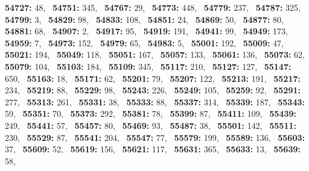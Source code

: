 \textbf{54727:} 48,\allowbreak~ 
\textbf{54751:} 345,\allowbreak~ 
\textbf{54767:} 29,\allowbreak~ 
\textbf{54773:} 448,\allowbreak~ 
\textbf{54779:} 237,\allowbreak~ 
\textbf{54787:} 325,\allowbreak~ 
\textbf{54799:} 3,\allowbreak~ 
\textbf{54829:} 98,\allowbreak~ 
\textbf{54833:} 108,\allowbreak~ 
\textbf{54851:} 24,\allowbreak~ 
\textbf{54869:} 50,\allowbreak~ 
\textbf{54877:} 80,\allowbreak~ 
\textbf{54881:} 68,\allowbreak~ 
\textbf{54907:} 2,\allowbreak~ 
\textbf{54917:} 95,\allowbreak~ 
\textbf{54919:} 191,\allowbreak~ 
\textbf{54941:} 99,\allowbreak~ 
\textbf{54949:} 173,\allowbreak~ 
\textbf{54959:} 7,\allowbreak~ 
\textbf{54973:} 152,\allowbreak~ 
\textbf{54979:} 65,\allowbreak~ 
\textbf{54983:} 5,\allowbreak~ 
\textbf{55001:} 192,\allowbreak~ 
\textbf{55009:} 47,\allowbreak~ 
\textbf{55021:} 194,\allowbreak~ 
\textbf{55049:} 118,\allowbreak~ 
\textbf{55051:} 167,\allowbreak~ 
\textbf{55057:} 133,\allowbreak~ 
\textbf{55061:} 136,\allowbreak~ 
\textbf{55073:} 62,\allowbreak~ 
\textbf{55079:} 104,\allowbreak~ 
\textbf{55103:} 184,\allowbreak~ 
\textbf{55109:} 345,\allowbreak~ 
\textbf{55117:} 210,\allowbreak~ 
\textbf{55127:} 127,\allowbreak~ 
\textbf{55147:} 650,\allowbreak~ 
\textbf{55163:} 18,\allowbreak~ 
\textbf{55171:} 62,\allowbreak~ 
\textbf{55201:} 79,\allowbreak~ 
\textbf{55207:} 122,\allowbreak~ 
\textbf{55213:} 191,\allowbreak~ 
\textbf{55217:} 234,\allowbreak~ 
\textbf{55219:} 88,\allowbreak~ 
\textbf{55229:} 98,\allowbreak~ 
\textbf{55243:} 226,\allowbreak~ 
\textbf{55249:} 105,\allowbreak~ 
\textbf{55259:} 92,\allowbreak~ 
\textbf{55291:} 277,\allowbreak~ 
\textbf{55313:} 261,\allowbreak~ 
\textbf{55331:} 38,\allowbreak~ 
\textbf{55333:} 88,\allowbreak~ 
\textbf{55337:} 314,\allowbreak~ 
\textbf{55339:} 187,\allowbreak~ 
\textbf{55343:} 59,\allowbreak~ 
\textbf{55351:} 70,\allowbreak~ 
\textbf{55373:} 292,\allowbreak~ 
\textbf{55381:} 78,\allowbreak~ 
\textbf{55399:} 87,\allowbreak~ 
\textbf{55411:} 109,\allowbreak~ 
\textbf{55439:} 249,\allowbreak~ 
\textbf{55441:} 57,\allowbreak~ 
\textbf{55457:} 80,\allowbreak~ 
\textbf{55469:} 93,\allowbreak~ 
\textbf{55487:} 38,\allowbreak~ 
\textbf{55501:} 142,\allowbreak~ 
\textbf{55511:} 230,\allowbreak~ 
\textbf{55529:} 87,\allowbreak~ 
\textbf{55541:} 204,\allowbreak~ 
\textbf{55547:} 77,\allowbreak~ 
\textbf{55579:} 199,\allowbreak~ 
\textbf{55589:} 136,\allowbreak~ 
\textbf{55603:} 37,\allowbreak~ 
\textbf{55609:} 52,\allowbreak~ 
\textbf{55619:} 156,\allowbreak~ 
\textbf{55621:} 117,\allowbreak~ 
\textbf{55631:} 365,\allowbreak~ 
\textbf{55633:} 13,\allowbreak~ 
\textbf{55639:} 58,\allowbreak~ 
